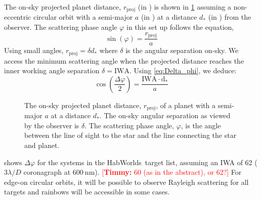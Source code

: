 \documentclass[
    usenatbib,
]{mnras}
\newcommand{\timmy}[1]{\textcolor{red}{[\textbf{Timmy:} #1]}} %
\newcommand{\hwo}{HabWorlds}
\begin{document}
%

The on-sky projected planet distance, $r_\mathrm{proj}$ (in \si{\au}) is shown in \cref{fig:scattering-angle} assuming a non-eccentric circular orbit with a semi-major $a$ (in \si{\au}) at a distance $d_*$ (in \si{\parsec}) from the observer. 
%
The scattering phase angle $\varphi$ in this set up follows the equation,
\begin{equation}
    \sin(\varphi) = \frac{r_\mathrm{proj}}{a}
\end{equation}
%
Using small angles, $r_\mathrm{proj} = \delta d_*$ where $\delta$ is the angular separation on-sky.
%
We access the minimum scattering angle when the projected distance reaches the inner working angle separation $\delta = \mathrm{IWA}$. 
%
Using \cref{eq:Delta_phi}, we deduce:
%
\begin{equation}
    \label{eq:scattering_angle}
    \cos\left(\dfrac{\Delta \varphi}{2}\right) = \frac{\mathrm{IWA \cdot d_*}}{a}
\end{equation}
\begin{figure}
    \centering
    
    \caption{
        The on-sky projected planet distance, $r_\mathrm{proj}$, of a planet with a semi-major $a$ at a distance $d_*$.
        The on-sky angular separation as viewed by the observer is $\delta$.
        The scattering phase angle, $\varphi$, is the angle between the line of sight to the star and the line connecting the star and planet.  
    }
    \label{fig:scattering-angle}
\end{figure}

 shows $\Delta \varphi$ for the systems in the \hwo\ target list, assuming an IWA of \SI{62}{\mas} ($3 \lambda / D$ coronagraph at $\SI{600}{\nano\meter}$). 
\timmy{60 (as in the abstract), or 62?}
%
%
For edge-on circular orbits, it will be possible to observe Rayleigh scattering for all targets and rainbows will be accessible in some cases.
\end{document}
